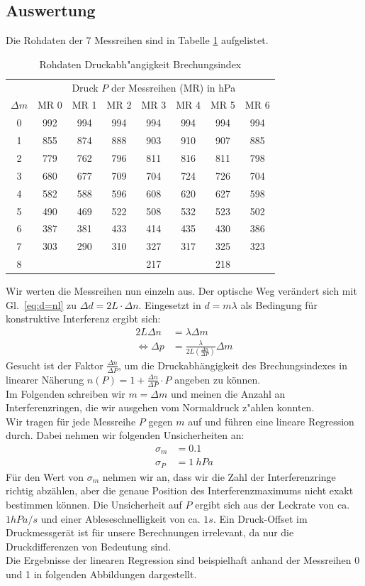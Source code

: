 \documentclass[12pt,a4paper]{article}
\begin{document}
\subsection{Auswertung}
Die Rohdaten der 7 Messreihen sind in Tabelle \ref{table:RohdatenDruck} aufgelistet.
\begin{table}[H]
	\centering
	\begin{tabular}{|c|c|c|c|c|c|c|c|}
		\hline
		&\multicolumn{7}{c|}{Druck $P$ der Messreihen (MR) in hPa}\\
		$\Delta m$&MR 0&MR 1&MR 2&MR 3&MR 4&MR 5&MR 6\\
		\hline
		0&992&994&994&994&994&994&994\\
		1&855&874&888&903&910&907&885\\
		2&779&762&796&811&816&811&798\\
		3&680&677&709&704&724&726&704\\
		4&582&588&596&608&620&627&598\\
		5&490&469&522&508&532&523&502\\
		6&387&381&433&414&435&430&386\\
		7&303&290&310&327&317&325&323\\
		8&&&&217&&218&\\
		\hline
	\end{tabular}
	\caption{Rohdaten Druckabh"angigkeit Brechungsindex}
	\label{table:RohdatenDruck}
\end{table}
Wir werten die Messreihen nun einzeln aus.
Der optische Weg verändert sich mit Gl.~\eqref{eq:d=nl} zu $\Delta d=2L\cdot\Delta n$. Eingesetzt in $d=m\lambda$ als Bedingung für konstruktive Interferenz ergibt sich:
\begin{align}
2L\Delta n&=\lambda\Delta m\nonumber\\
\Leftrightarrow\Delta p&=\frac{\lambda}{2L(\frac{\Delta n}{\Delta P})}\Delta m
\end{align}
Gesucht ist der Faktor $\frac{\Delta n}{\Delta P}$, um die Druckabhängigkeit des Brechungsindexes in linearer Näherung $n(P)=1+\frac{\Delta n}{\Delta P}\cdot P$ angeben zu können.\\
Im Folgenden schreiben wir $m=\Delta m$ und meinen die Anzahl an Interferenzringen, die wir ausgehen vom Normaldruck z"ahlen konnten.\\
Wir tragen für jede Messreihe $P$ gegen $m$ auf und führen eine lineare Regression durch. Dabei nehmen wir folgenden Unsicherheiten an:
\begin{align}
\sigma_{m}&=0.1\\
\sigma_{P}&=1\ hPa
\end{align}
Für den Wert von $\sigma_m$ nehmen wir an, dass wir die Zahl der Interferenzringe richtig abzählen, aber die genaue Position des Interferenzmaximums nicht exakt bestimmen können. Die Unsicherheit auf $P$ ergibt sich aus der Leckrate von ca. $1hPa/s$ und einer Ableseschnelligkeit von ca. $1s$. Ein Druck-Offset im Druckmessgerät ist für unsere Berechnungen irrelevant, da nur die Druckdifferenzen von Bedeutung sind. \\
Die Ergebnisse der linearen Regression sind beispielhaft anhand der Messreihen 0 und 1 in folgenden Abbildungen dargestellt.
\end{document}
